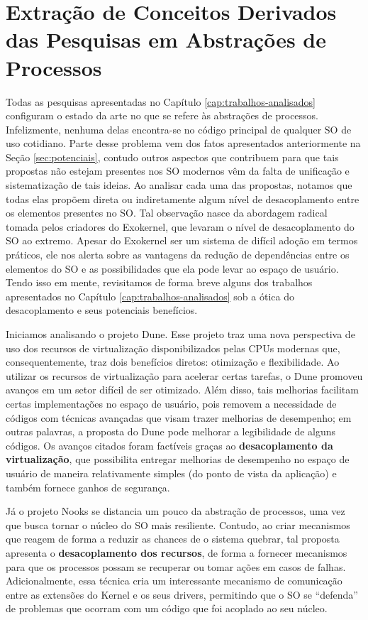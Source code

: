 

\section{Extração de Conceitos Derivados das Pesquisas em Abstrações de Processos}
\label{sec:extracao}

Todas as pesquisas apresentadas no Capítulo \ref{cap:trabalhos-analisados}
configuram o estado da arte no que se refere às abstrações de processos.
Infelizmente, nenhuma delas encontra-se no código principal de qualquer SO de
uso cotidiano. Parte desse problema vem dos fatos apresentados anteriormente na Seção
\ref{sec:potenciais}, contudo outros aspectos que contribuem para que tais
propostas não estejam presentes nos SO modernos vêm da falta de unificação e
sistematização de tais ideias. Ao analisar cada uma das propostas, notamos que
todas elas propõem direta ou indiretamente algum nível de desacoplamento entre
os elementos presentes no SO. Tal observação nasce da abordagem radical tomada
pelos criadores do Exokernel, que levaram o nível de desacoplamento do SO ao
extremo. Apesar do Exokernel ser um sistema de difícil adoção em termos
práticos, ele nos alerta sobre as vantagens da redução de dependências
entre os elementos do SO e as possibilidades que ela pode levar ao espaço de
usuário. Tendo isso em mente, revisitamos de forma breve alguns dos trabalhos
apresentados no Capítulo \ref{cap:trabalhos-analisados} sob a ótica do
desacoplamento e seus potenciais benefícios.

Iniciamos analisando o projeto Dune. Esse projeto traz uma nova perspectiva de uso dos recursos de virtualização
disponibilizados pelas CPUs modernas que, consequentemente, traz dois
benefícios diretos: otimização e flexibilidade. Ao utilizar os recursos de
virtualização para acelerar certas tarefas, o Dune promoveu avanços em um setor
difícil de ser otimizado. Além disso, tais melhorias facilitam certas
implementações no espaço de usuário, pois removem a necessidade de códigos com
técnicas avançadas que visam trazer melhorias de desempenho; em outras
palavras, a proposta do Dune pode melhorar a legibilidade de alguns códigos.
Os avanços citados foram factíveis graças ao \textbf{desacoplamento da
virtualização}, que possibilita entregar melhorias de desempenho no
espaço de usuário de maneira relativamente simples (do ponto de vista da
aplicação) e também fornece ganhos de segurança.

Já o projeto Nooks se distancia um pouco da abstração de processos, uma vez que
busca tornar o núcleo do SO mais resiliente. Contudo, ao criar mecanismos
que reagem de forma a reduzir as chances de o sistema quebrar, tal proposta
apresenta o \textbf{desacoplamento dos recursos}, de forma a fornecer mecanismos
para que os processos possam se recuperar ou tomar ações em casos de falhas.
Adicionalmente, essa técnica cria um interessante mecanismo de
comunicação entre as extensões do Kernel e os seus drivers, permitindo que o SO
se ``defenda'' de problemas que ocorram com um código que foi acoplado ao seu
núcleo.

